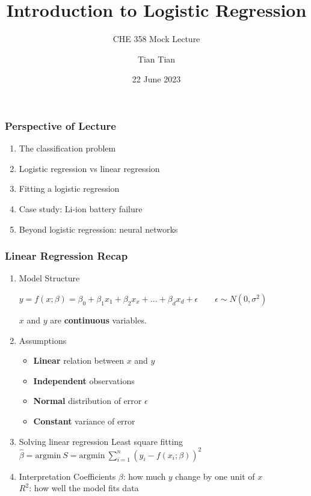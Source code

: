 \documentclass[10pt,aspectratio=169]{beamer}
\title{\Large \bfseries Introduction to Logistic Regression}
\subtitle{\large CHE 358 Mock Lecture}
\author{\large Tian Tian}
\date{\large 22 June 2023}
\begin{document}
 {  \frame{\titlepage} }


\begin{frame}[c]
  \frametitle{Perspective of Lecture}
  \begin{enumerate}
  \item The classification problem \vfill \item Logistic regression vs
    linear regression \vfill \item Fitting a logistic regression
    \vfill \item Case study: Li-ion battery failure \vfill \item
    Beyond logistic regression: neural networks
  \end{enumerate}
\end{frame}


\begin{frame}
  \frametitle{Linear Regression Recap}
  \begin{enumerate}
  \item Model Structure

    \vfill
    $y = f(x; \beta) = β_{0} + β_{1} x_{1} + β_{2} x_{x} + ... + β_{d}
    x_{d} + \epsilon \quad\quad \epsilon \sim N(0, \sigma^{2})$

    $x$ and $y$ are \textbf{continuous} variables.
    
    \vfill \item Assumptions

    \vfill
    \begin{itemize}
    \item \textbf{Linear} relation between $x$ and $y$
    \item \textbf{Independent} observations
    \item \textbf{Normal} distribution of error $\epsilon$
    \item \textbf{Constant} variance of error
    \end{itemize}


 
    \vfill \item Solving linear regression \vfill Least square fitting
    ${\displaystyle \hat{\beta} = \mathrm{argmin}\ S =
      \mathrm{argmin}\ \sum_{i=1}^{n} (y_{i} - f(x_{i}; \beta))^{2}}$
    
    \vfill \item Interpretation \vfill
    Coefficients $\beta$: how much $y$ change by one unit of $x$\\
    $R^{2}$: how well the model fits data
    
    
  \end{enumerate}

\end{frame}
\end{document}
